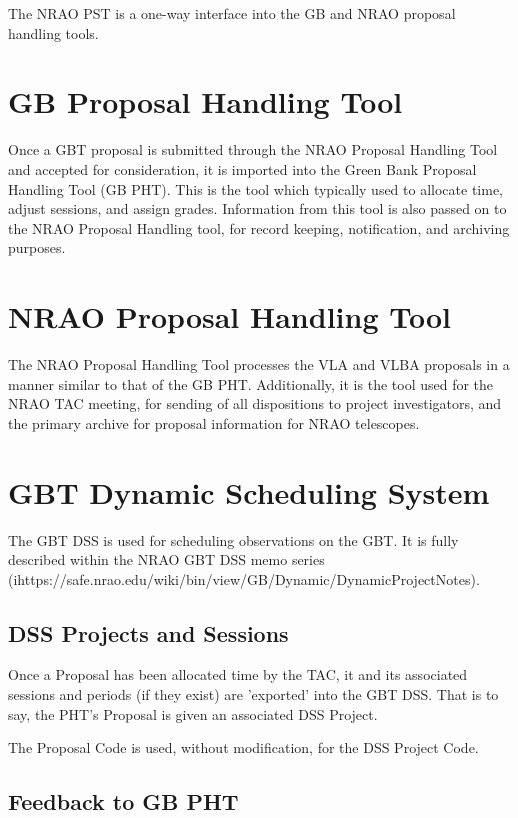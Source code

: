 \documentclass{article}
\begin{document}
The NRAO PST is a one-way interface into the GB and NRAO proposal handling tools.

\section{GB Proposal Handling Tool}\label{gb_pht_sec}

Once a GBT proposal is submitted through the NRAO Proposal Handling Tool and accepted for consideration, it is
imported into the Green Bank Proposal Handling Tool (GB PHT).  This is the tool which typically used to allocate time, 
adjust sessions, and assign grades.  Information from this tool is also passed on to the NRAO Proposal Handling tool,
for record keeping, notification, and archiving purposes.


\section{NRAO Proposal Handling Tool}\label{nrao_pht_sec}

The NRAO Proposal Handling Tool processes the VLA and VLBA proposals in a manner similar to that of the GB PHT.  Additionally, it is the tool used for the NRAO TAC meeting, for sending of all dispositions to project investigators, and the primary archive for proposal information for NRAO telescopes.

\section{GBT Dynamic Scheduling System}\label{dss_sec}

The GBT DSS is used for scheduling observations on the GBT.  It is fully described within the NRAO GBT DSS memo series (ihttps://safe.nrao.edu/wiki/bin/view/GB/Dynamic/DynamicProjectNotes).

\subsection{DSS Projects and Sessions}

Once a Proposal has been allocated time by the TAC, it and its associated sessions and periods (if they exist) are 'exported' into the
GBT DSS.  That is to say, the PHT's Proposal is given an associated DSS Project.

The Proposal Code is used, without modification, for the DSS Project Code.

\subsection{Feedback to GB PHT}
\end{document}
